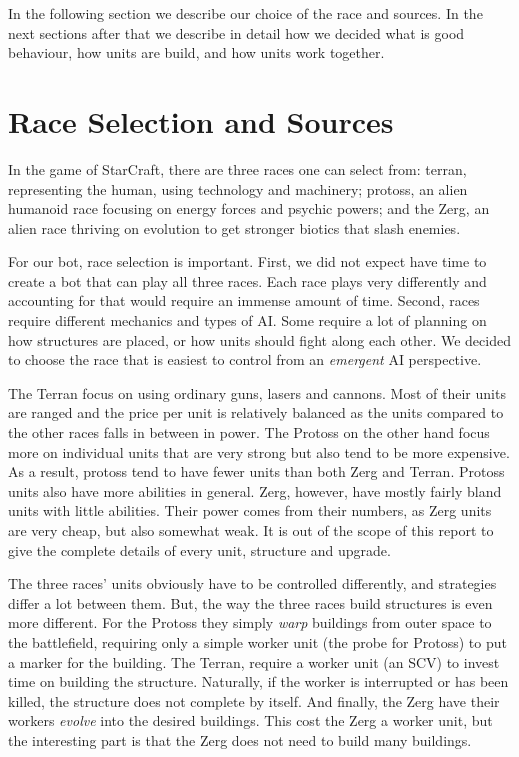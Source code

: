 In the following section we describe our choice of the race and sources. In the next sections after that we describe in detail how we decided what is good behaviour, how units are build, and how units work together.

\section{Race Selection and Sources}
\label{strategy:race}
In the game of StarCraft, there are three races one can select from: terran, representing the human, using technology and machinery; protoss, an alien humanoid race focusing on energy forces and psychic powers; and the Zerg, an alien race thriving on evolution to get stronger biotics that slash enemies.

For our bot, race selection is important. First, we did not expect have time to create a bot that can play all three races. Each race plays very differently and accounting for that would require an immense amount of time. Second, races require different mechanics and types of AI. Some require a lot of planning on how structures are placed, or how units should fight along each other. We decided to choose the race that is easiest to control from an \emph{emergent} AI perspective.

The Terran focus on using ordinary guns, lasers and cannons. Most of their units are ranged and the price per unit is relatively balanced as the units compared to the other races falls in between in power. The Protoss on the other hand focus more on individual units that are very strong but also tend to be more expensive. As a result, protoss tend to have fewer units than both Zerg and Terran. Protoss units also have more abilities in general. Zerg, however, have mostly fairly bland units with little abilities. Their power comes from their numbers, as Zerg units are very cheap, but also somewhat weak. It is out of the scope of this report to give the complete details of every unit, structure and upgrade.

The three races' units obviously have to be controlled differently, and strategies differ a lot between them. But, the way the three races build structures is even more different. For the Protoss they simply \emph{warp} buildings from outer space to the battlefield, requiring only a simple worker unit (the probe for Protoss) to put a marker for the building. The Terran, require a worker unit (an SCV) to invest time on building the structure. Naturally, if the worker is interrupted or has been killed, the structure does not complete by itself. And finally, the Zerg have their workers \emph{evolve} into the desired buildings. This cost the Zerg a worker unit, but the interesting part is that the Zerg does not need to build many buildings.

